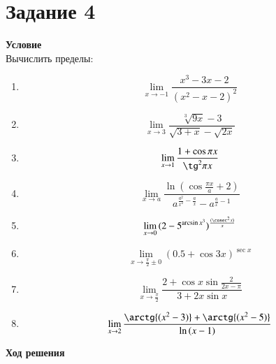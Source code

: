 
\newpage
\section{Задание 4}
 {\bf\large Условие} \\Вычислить пределы:
\begin{multicols}{2}
    \begin{enumerate}
        \item
              \[
                  \lim_{x\rightarrow -1}{\frac
                      {x^3-3x-2}
                      {(x^2-x-2)^2}}
              \]
        \item
              \[
                  \lim_{x\rightarrow  3}{\frac
                      {\sqrt[3]{9x}-3}
                      {\sqrt{3+x}-\sqrt{2x}}}
              \]
        \item
              \[
                  \lim_{x\rightarrow 1}{\frac
                  {1+\cos{\pi x}}
                  {\tg^2{\pi x}}}
              \]
        \item
              \[
                  \lim_{x\rightarrow a}{\frac
                  {\ln{( \cos{\frac{\pi x}{a}}+2)}}
                  {a^{\frac{a^2}{x^2}-\frac{a}{x}}-a^{\frac{a}{x}-1}}}
              \]
        \item
              \[
                  \lim_{x\rightarrow  0}{
                  (2-5^{\arcsin{x^3}})^\frac{(\cosec^2{x})}{x}
                  }
              \]
        \item
              \[
                  \lim_{x\rightarrow  \frac{\pi}{2} \pm 0}{
                      (0.5+\cos{3x})^{\sec{x}}
                  }
              \]
        \item
              \[
                  \lim_{x\rightarrow  \frac{\pi}{2}}{
                      \frac{2+\cos{x}\sin{\frac{2}{2x-\pi}}}{3+2x\sin{x}}
                  }
              \]
        \item
              \[
                  \lim_{x\rightarrow  2}{
                      \frac{\arctg{(x^2-3)}+\arctg{(x^2-5)}}{\ln{(x-1)}}
                  }
              \]
    \end{enumerate}
\end{multicols}
\newpage
{\bf\large Ход решения}
